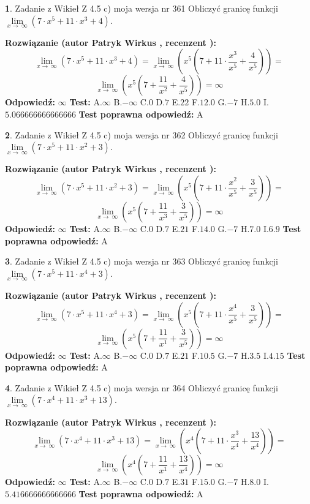 \documentclass[12pt, a4paper]{article}
\theoremstyle{definition} %
\newtheorem{zad}{}
\newcommand{\zadStart}[1]{\begin{zad}#1\newline}
\newcommand{\zadStop}{\end{zad}}
\newcommand{\rozwStart}[2]{\noindent \textbf{Rozwiązanie (autor #1 , recenzent #2): }\newline}
\newcommand{\rozwStop}{\newline}
\newcommand{\odpStart}{\noindent \textbf{Odpowiedź:}\newline}
\newcommand{\odpStop}{\newline}
\newcommand{\testStart}{\noindent \textbf{Test:}\newline}
\newcommand{\testStop}{\newline}
\newcommand{\kluczStart}{\noindent \textbf{Test poprawna odpowiedź:}\newline}
\newcommand{\kluczStop}{\newline}
\begin{document}
\zadStart{Zadanie z Wikieł Z 4.5 c) moja wersja nr 361}
Obliczyć granicę funkcji  $\lim\limits_{x\to\ \infty}(7 \cdot x^{5}+11 \cdot x^{3}+4)$.
\zadStop
\rozwStart{Patryk Wirkus}{}
$$\lim\limits_{x\to\ \infty}(7 \cdot x^{5}+11 \cdot x^{3}+4) = \lim\limits_{x\to\ \infty}(x^{5}(7 +11 \cdot \frac{x^{3}}{x^{5}}+\frac{4}{x^{5}})) =$$ $$\lim\limits_{x\to\ \infty}(x^{5}(7 +\frac{11}{x^{2}}+\frac{4}{x^{5}})) =\infty$$
\rozwStop
\odpStart
$\infty$
\odpStop
\testStart
A.$\infty$ B.$-\infty$ C.$0$ D.$7$ E.$22$
F.$12.0$ G.$-7$
H.$5.0$
I.$5.066666666666666$
\testStop
\kluczStart
A
\kluczStop



\zadStart{Zadanie z Wikieł Z 4.5 c) moja wersja nr 362}
Obliczyć granicę funkcji  $\lim\limits_{x\to\ \infty}(7 \cdot x^{5}+11 \cdot x^{2}+3)$.
\zadStop
\rozwStart{Patryk Wirkus}{}
$$\lim\limits_{x\to\ \infty}(7 \cdot x^{5}+11 \cdot x^{2}+3) = \lim\limits_{x\to\ \infty}(x^{5}(7 +11 \cdot \frac{x^{2}}{x^{5}}+\frac{3}{x^{5}})) =$$ $$\lim\limits_{x\to\ \infty}(x^{5}(7 +\frac{11}{x^{3}}+\frac{3}{x^{5}})) =\infty$$
\rozwStop
\odpStart
$\infty$
\odpStop
\testStart
A.$\infty$ B.$-\infty$ C.$0$ D.$7$ E.$21$
F.$14.0$ G.$-7$
H.$7.0$
I.$6.9$
\testStop
\kluczStart
A
\kluczStop



\zadStart{Zadanie z Wikieł Z 4.5 c) moja wersja nr 363}
Obliczyć granicę funkcji  $\lim\limits_{x\to\ \infty}(7 \cdot x^{5}+11 \cdot x^{4}+3)$.
\zadStop
\rozwStart{Patryk Wirkus}{}
$$\lim\limits_{x\to\ \infty}(7 \cdot x^{5}+11 \cdot x^{4}+3) = \lim\limits_{x\to\ \infty}(x^{5}(7 +11 \cdot \frac{x^{4}}{x^{5}}+\frac{3}{x^{5}})) =$$ $$\lim\limits_{x\to\ \infty}(x^{5}(7 +\frac{11}{x^{1}}+\frac{3}{x^{5}})) =\infty$$
\rozwStop
\odpStart
$\infty$
\odpStop
\testStart
A.$\infty$ B.$-\infty$ C.$0$ D.$7$ E.$21$
F.$10.5$ G.$-7$
H.$3.5$
I.$4.15$
\testStop
\kluczStart
A
\kluczStop



\zadStart{Zadanie z Wikieł Z 4.5 c) moja wersja nr 364}
Obliczyć granicę funkcji  $\lim\limits_{x\to\ \infty}(7 \cdot x^{4}+11 \cdot x^{3}+13)$.
\zadStop
\rozwStart{Patryk Wirkus}{}
$$\lim\limits_{x\to\ \infty}(7 \cdot x^{4}+11 \cdot x^{3}+13) = \lim\limits_{x\to\ \infty}(x^{4}(7 +11 \cdot \frac{x^{3}}{x^{4}}+\frac{13}{x^{4}})) =$$ $$\lim\limits_{x\to\ \infty}(x^{4}(7 +\frac{11}{x^{1}}+\frac{13}{x^{4}})) =\infty$$
\rozwStop
\odpStart
$\infty$
\odpStop
\testStart
A.$\infty$ B.$-\infty$ C.$0$ D.$7$ E.$31$
F.$15.0$ G.$-7$
H.$8.0$
I.$5.416666666666666$
\testStop
\kluczStart
A
\kluczStop
\end{document}
